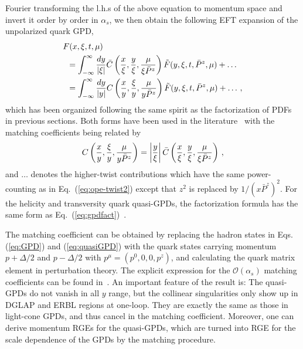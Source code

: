 \documentclass[aps,rmp,reprint,amsmath,amssymb,graphicx,longbibliography]{revtex4-1} %
\newcommand{\beq}{\begin{eqnarray}}
\newcommand{\eeq}{\end{eqnarray}}
\newcommand{\nn}{\nonumber}
\DeclareRobustCommand{\eq}[1]{Eq.~(\ref{eq:#1})}
\begin{document}
Fourier transforming the l.h.s of the above equation to momentum space and invert it order by order in $\alpha_s$, we then obtain the following EFT expansion of the unpolarized quark GPD,
\begin{align}\label{eq:gpdfact}
	&F(x,\xi,t,\mu) \\
	&\hspace{0.5em}=  \int_{-\infty}^\infty {dy\over |\xi|}\bar{C}\left({x\over \xi}, {y\over \xi}, {\mu \over \xi {\bar P}^z }\right){\tilde F}(y,\xi,t, {\bar P}^z,\mu) +\ldots\nn\\
	&\hspace{0.5em}= \int_{-\infty}^\infty {dy\over |y|}C\left({x\over y}, {\xi\over y}, {\mu \over y{\bar P}^z }\right){\tilde F}(y,\xi,t,{\bar P}^z,\mu)+ \ldots\,,\nn
\end{align}
which has been organized following the same spirit as the factorization of PDFs in previous sections. Both forms have been used in the literature~\cite{Ji:2015qla,Xiong:2015nua,Liu:2019urm} with the matching coefficients being related by
\beq
C\left({x\over y}, {\xi\over y}, {\mu \over y{\bar P}^z }\right) = \left|{y\over \xi}\right|\bar{C}\left({x\over \xi}, {y\over \xi}, {\mu \over \xi {\bar P}^z }\right)\,,
\eeq
and $\ldots$ denotes the higher-twist contributions which have the same power-counting as in Eq.~(\ref{eq:ope-twist2}) except that $z^2$ is replaced by $1/(x{\bar P}^z)^2$. For the helicity and transversity quark quasi-GPDs, the factorization formula has the same form as \eq{gpdfact}~\cite{Liu:2019urm}.

The matching coefficient can be obtained by replacing the hadron states in Eqs. (\ref{eq:GPD}) and (\ref{eq:quasiGPD}) with the quark states carrying momentum $p+\Delta/2$ and $p-\Delta/2$ with $p^\mu=(p^0,0,0,p^z)$, and calculating the quark matrix element in perturbation theory.
%
The explicit expression for the $\mathcal O(\alpha_s)$ matching coefficients can be found in~\cite{Liu:2019urm}.
%
An important feature of the result is: The quasi-GPDs do not vanish in all $y$ range, but the collinear singularities only show up in DGLAP and ERBL regions at one-loop. They are exactly the same as those in light-cone GPDs, and thus cancel in the matching coefficient. Moreover, one can derive momentum RGEs for the quasi-GPDs,
which are turned into RGE for the scale dependence of the GPDs by
the matching procedure.
\end{document}
